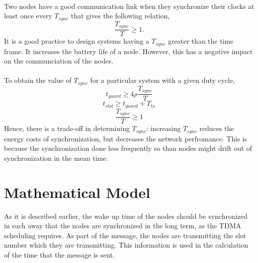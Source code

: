 \documentclass[a4paper,10pt]{report}
\begin{document}
\paragraph*{}
Two nodes have a good communication link when they synchronize their clocks at least once every $T_{sync}$ that gives the following
relation,
\begin{equation}
\frac{T_{sync}}{T}\geq 1.
\end{equation}
It is a good practice to design systems having a $T_{sync}$ greater than the time frame. It increases the battery life of a node. However,
this has a negative impact on the communciation of the nodes.
\paragraph*{}
To obtain the value of $T_{sync}$ for a particular system with a given duty cycle,
\begin{equation}
t_{guard} \geq 4\rho \frac{T_{sync}}{T}
\end{equation}
\begin{equation}
t_{slot} \geq t_{guard} + T_{tx}
\end{equation}
\begin{equation}
\frac{T_{sync}}{T} \geq 1
\end{equation}
Hence, there is a trade-off in determining $T_{sync}$: increasing $T_{sync}$ reduces the energy costs of synchronization, but decreases the network perfromance. This is because the synchronization done less frequently so than nodes might drift out of synchronization in the mean time.
\section{\textbf{Mathematical Model}}
As it is described earlier, the wake up time of the nodes should be synchronized in such away that the nodes are synchronized in the
long term, as the TDMA scheduling requires. As part of the message, the nodes are transmitting the slot number which they are transmitting. This information is used in the calculation of the time that the message is sent.
\end{document}
